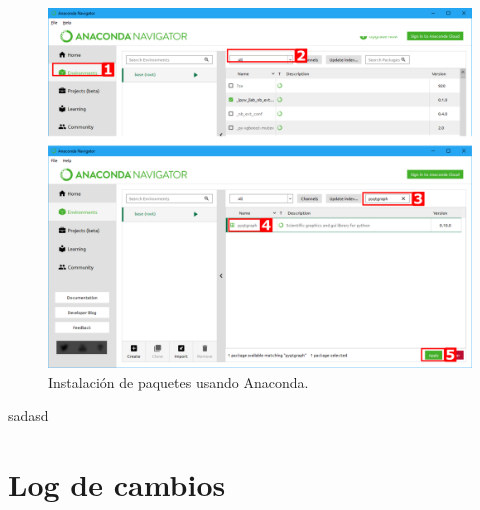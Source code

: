 \documentclass[twoside,a4paper]{refart}
\begin{document}
\begin{fullpage}
\begin{figure}
\centering
\caption{Instalación de paquetes usando Anaconda.}
\includegraphics[width=0.8\linewidth]{./imagenes/anaconda_paquetes.png}
\end{figure}
\end{fullpage}


sadasd


\section{Log de cambios}


\printindex
\end{document}
